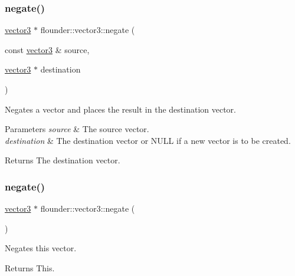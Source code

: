 \subsubsection{\texorpdfstring{negate()}{negate()}\hspace{0.1cm}{\footnotesize\ttfamily [1/2]}}
{\footnotesize\ttfamily \hyperlink{classflounder_1_1vector3}{vector3} $\ast$ flounder\+::vector3\+::negate (\begin{DoxyParamCaption}\item[{const \hyperlink{classflounder_1_1vector3}{vector3} \&}]{source,  }\item[{\hyperlink{classflounder_1_1vector3}{vector3} $\ast$}]{destination }\end{DoxyParamCaption})\hspace{0.3cm}{\ttfamily [static]}}



Negates a vector and places the result in the destination vector. 


\begin{DoxyParams}{Parameters}
{\em source} & The source vector. \\
\hline
{\em destination} & The destination vector or N\+U\+LL if a new vector is to be created. \\
\hline
\end{DoxyParams}
\begin{DoxyReturn}{Returns}
The destination vector. 
\end{DoxyReturn}
\mbox{\label{classflounder_1_1vector3_a44cff187eea36ab0e0790e76f82fcc5d}} 
\subsubsection{\texorpdfstring{negate()}{negate()}\hspace{0.1cm}{\footnotesize\ttfamily [2/2]}}
{\footnotesize\ttfamily \hyperlink{classflounder_1_1vector3}{vector3} $\ast$ flounder\+::vector3\+::negate (\begin{DoxyParamCaption}{ }\end{DoxyParamCaption})}



Negates this vector. 

\begin{DoxyReturn}{Returns}
This. 
\end{DoxyReturn}
\mbox{\label{classflounder_1_1vector3_aedfa53c941fa5fe61d738c6d5c9fb47e}} 
